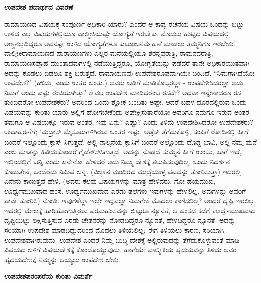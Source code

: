{\bf ಉಪದೇಶ ಪದಾರ್ಥದ ವಿವರಣೆ} 


ರಾಮಾಯಣದ ವಿಷಯಕ್ಕೆ ಸಂಪೂರ್ಣ ಅಧಿಕಾರಿ ಯಾರು? ಎಂದರೆ ಆ ಕಾವ್ಯ ರಚನೆಯ ವಿಷಯ ಒಂದನ್ನು ಬಿಟ್ಟು ಉಳಿದ ಎಲ್ಲ ವಿಷಯಗಳಲ್ಲಿಯೂ ವಾಲ್ಮೀಕಿಯಷ್ಟೇ ಯೋಗ್ಯತೆ ಇರಬೇಕು. ಮೊದಲು ಹುಟ್ಟಿದ ವಿಷಯದಲ್ಲಿ ಅಣ್ಣನಲ್ಲದಿದ್ದರೂ ಅವನಷ್ಟೇ ಉಳಿದ ಯೋಗ್ಯತೆಗಳೂ ಕುಟುಂಬನಿರ್ವಹಣೆ ಮಾಡಲು ತಮ್ಮನಿಗೂ ಇರಬೇಕು. ವಾಲ್ಮೀಕಿರಾಮಾಯಣದ ಪಾರಾಯಣಗಳು ಎಲ್ಲರ ಮನೆಯಲ್ಲಿಯೂ ಶರನ್ನವರಾತ್ರಿ, ರಾಮನವರಾತ್ರಿ, ರಾಮಾಯಣಸಪ್ತಾಹ ಮುಂತಾದವುಗಳಲ್ಲಿ ನಡೆಯುತ್ತಿದ್ದರೂ, ಯೋಗ್ಯತೆಯನ್ನು ಪಡೆದರೆ ತಾನೇ ಅಧಿಕಾರಯುತವಾಗಿ ಅದನ್ನು ಕೊಡಲು ಬಿಡಲೂ ಶಕ್ತಿ ಬರುತ್ತದೆ. ರಾಮಾಯಣವು ಉಪದೇಶರೂಪವಾಗಿಯೇ ಬಂದಿದೆ. ``ನಿಮಗಾಗಿದೆಯೋ ಉಪದೇಶ?" (ಹೌದು, ಎಂದು ಉತ್ತರ ಬಂತು.) ಅವರು ಅಡಿಗೆ ಮಾಡಿಕೊಟ್ಟರಲ್ಲಾ - ಉಪದೇಶಿಸಿದರಲ್ಲಾ ಅದು ನಿಮಗೆ ಅಂದು ಎಷ್ಟು ರುಚಿಯಾಗಿತ್ತು? ಕೇವಲ ಉಪದೇಶ ಮಾಡಿದರೆಂಬ ರಸವೇ? ಅಥವಾ ಇನ್ನೇನಾದರೂ ರಸ ತುಂಬಿದರೋ ಉಪದೇಶಕರು? ಅವರಿಂದ ಒಂದು ಶ್ಲೋಕ ಬಂದಿತು ಅಷ್ಟೇ. ಆದರೆ ಬಹಳ ದೂರದಲ್ಲಿರುವ ಒಂದು ವಿಷಯವನ್ನು ಕುರಿತು ಯಾರು ಅಲ್ಲಿಗೆ ಹೋಗಬೇಕೆಂದು ಅಪೇಕ್ಷಿಸುತ್ತಾರೆಯೋ ಅವರಿಗೂ ನಮಗೂ ಇರುವ ಅಂತರ ತಮಗೂ ಆ ವಿಷಯಕ್ಕೂ ಇರುವ ಅಂತರ, ಇವು ಏನು? ಎಷ್ಟು? ಎಂದು ತಿಳಿದು ಉಪದೇಶಿಸಿದರೋ ಉಪದೇಶಕರು? ಉದಾಹರಣೆಗೆ; `ಮದ್ರಾಸ್‍ ಮೈಸೂರುಗಳಿಗಿರುವ ಅಂತರ ಇಷ್ಟು, ಅಡ್ರೆಸ್‍ ತೆಗೆದುಕೊಳ್ಖಿ, ಸಂಪಿಗೆ ರೋಡಿನಲ್ಲಿ ಹೀಗೆ ಬಂದರೆ ಇಲ್ಲೊಂದು ಕ್ರಾಸ್‍ ಸಿಗುತ್ತದೆ. ಅಲ್ಲಿ ನಾಲ್ಕನೆಯ ಕ್ರಾಸಿಗೆ ಬಂದರೆ ಅಲ್ಲೊಂದು ದೊಡ್ಡ ಬಾವಿ, ಅಲ್ಲಿ ನಮ್ಮ ಮನೆ ಎಂಬ ಮಾತನ್ನು ಹಿಡಿದುಕೊಂಡರೆ ಗೈಡೆನ್ಸ್‍ಸಿಗುತ್ತದೆ. ಅದನ್ನು ನೊಡದೆ ಸುಮ್ಮನೆ ಹೀಗೆ ಉಂಟು, ಹಾಗೆ ಇದೆ, ಇಲ್ಲಿಂದಲ್ಲಿಗೆ ಬನ್ನಿ ಎಂದು ಏನೇನೋ ಹೇಳಿದರೆ ಅದು ನಿಮ್ಮ ದೇಶಕ್ಕೆ ತಲುಪಿಸುವುದಿಲ್ಲ. ಒಂದು ನಿದರ್ಶನ ಕೊಡುತ್ತೇನೆ, ಒಂದೆರೆಡು ನಿಮಿಷ ಬನ್ನಿ. (ವಿಜ್ಞಾನ ಮಂದಿರದ ಮುದ್ರೆಯುಳ್ಳ ಪಟವನ್ನು ತೋರಿಸುತ್ತಾ) ಇದರಲ್ಲಿ ಏನೇನು ಕಾಣುತ್ತದೆ ಹೇಳಿ, (ಅವರು ಕೆಲವು ವಿಷಯಗಳನ್ನು ಮಾತ್ರ ಹೇಳಿದರು. ಗೋ-ಹಯಮುಖ, ಊರ್ಧ್ವಮುಖವಾದ ಹಂಸ. ಊರ್ಧ್ವಮುಖವಾದ ಎರಡು ತಲೆಗಳು ಇವುಗಳನ್ನು ಹೇಳಲಿಲ್ಲ. ಅವುಗಳನ್ನು ಅವರಿಗೆ ತಾವೇ ತೋರಿಸಿ) ನೋಡಿ. ಇವುಗಳೆಲ್ಲಾ ಇಲ್ಲೇ ಇದ್ದವಲ್ಲಾ ನಿಮಗೇಕೆ ಮೊದಲು ಕಾಣಿಸಲಿಲ್ಲ? ಅಂದರೆ ದೃಷ್ಟಿ ಇರಲಿಲ್ಲ. ಇದರಲ್ಲಿ ಮೇಲಕ್ಕೆ ಹಾರಿಹೋಗುತ್ತಿರುವ ಪರಮಹಂಸವನ್ನು ಬಿಟ್ಟರೂ ನ್ಯೂನತೆ, ಆ ಹಂಸದ ಕಡೆಗೆ ಊರ್ಧ್ವಮುಖವಾದ ದೃಷ್ಟಿಯಿಟ್ಟು ಲಕ್ಷಿಸುತ್ತಿಸುವ ಎರಡು ಚೇತನರನ್ನು ನೋಡದಿದ್ದರೂ ನ್ಯೂನತೆ, ಹೇಳದಿದ್ದರೂ ನ್ನೂನತೆ. ಅದನ್ನು ಸರಿಯಾಗಿ ಉಪದೇಶ ಮಾಡದಿದ್ದುದರಿಂದ ಮೊದಲು ತಿಳಿಯಲಿಲ್ಲ; ಈಗ ತಿಳಿಯಲು ಕಾರಣ, ಸರಿಯಾಗಿ ಉಪದೇಶವಾಗಿರುವುದು. ಉಪದೇಶ ಎಂದರೆ ನಿಮ್ಮ ಬುದ್ಧಿ ದೇಶಕ್ಕೆ ಅಲ್ಲಿರುವುದನ್ನು ತೆಗೆದುಕೊಳ್ಳುವಂತೆ ಮಾಡಿ ವಿಷಯದ ಬಳಿಗೆ ವಿಷಯದೇಶಕ್ಕೆ ಕೊಂಡೊಯ್ಯುವುದು. ಹಾಗೆಯೇ ವಾಲ್ಮೀಕಿಯ ಹೃದಯವನ್ನು ತಿಳಿದು ಅವರ ಹೃದಯದೇಶಕ್ಕೆ ನಿಮ್ಮನ್ನು ಒಯ್ಯಲು ಉಪದೇಶ ಬೇಕು. 


{\bf ಉಪದೇಶಪರಂಪರೆಯ ಕುರಿತು ವಿಮರ್ಶೆ} 


